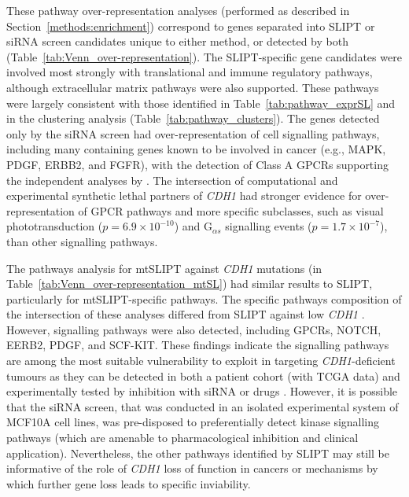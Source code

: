 These \gls{pathway} over-representation analyses (performed as described in Section~\ref{methods:enrichment}) correspond to genes separated into \gls{SLIPT} or \gls{siRNA} screen candidates unique to either method, or detected by both (Table~\ref{tab:Venn_over-representation}). The \gls{SLIPT}-specific gene candidates were involved most strongly with translational and immune regulatory \glspl{pathway}, although extracellular matrix \glspl{pathway} were also supported. These \glspl{pathway} were largely consistent with those identified in Table~\ref{tab:pathway_exprSL} and in the clustering analysis (Table~\ref{tab:pathway_clusters}). The genes detected only by the \gls{siRNA} screen had over-represent\-ation of cell signalling \glspl{pathway}, including many containing genes known to be involved in cancer (e.g., MAPK, PDGF, ERBB2, and FGFR), with the detection of Class A GPCRs supporting the independent analyses by \citet{Telford2015}. The intersection of computational and experimental \gls{synthetic lethal} partners of \textit{CDH1} had stronger evidence for over-represent\-ation of \gls{GPCR} \glspl{pathway} and more specific subclasses, such as visual phototransduction ($p=6.9 \times 10^{-10}$) and G$_{\alpha s}$ signalling events ($p=1.7 \times 10^{-7}$), than other signalling \glspl{pathway}.

The \glspl{pathway} analysis for \acrshort{mtSLIPT} against \textit{CDH1} \glspl{mutation} (in Table~\ref{tab:Venn_over-representation_mtSL}) had similar results to \gls{SLIPT}, particularly for \acrshort{mtSLIPT}-specific  \glspl{pathway}. The specific \glspl{pathway} composition of the intersection of these analyses differed from \gls{SLIPT} against low \textit{CDH1} . However, signalling \glspl{pathway} were also detected, including \glspl{GPCR}, NOTCH, EERB2, PDGF, and SCF-KIT. These findings indicate the signalling \glspl{pathway} are among the most suitable vulnerability to exploit in targeting \textit{CDH1}-deficient tumours as they can be detected in both a patient cohort (with \gls{TCGA}  data) and experimentally tested by inhibition with \gls{siRNA} or drugs \citep{Telford2015}. However, it is possible that the \gls{siRNA} screen, that was conducted in an isolated experimental system of MCF10A cell lines, was pre-disposed to preferentially detect kinase signalling \glspl{pathway} (which are amenable to pharmacological inhibition and clinical application). Nevertheless, the other \glspl{pathway} identified by \gls{SLIPT} may still be informative of the role of \textit{CDH1} loss of function in cancers or mechanisms by which further gene loss leads to specific inviability.


